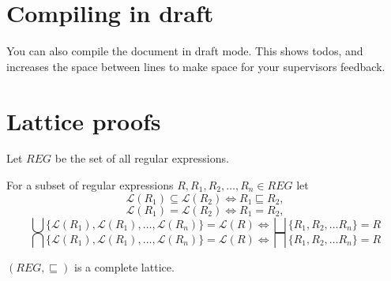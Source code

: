 
\section{Compiling in draft}\label{sec:compiling-in-draft}
You can also compile the document in draft mode.
This shows todos, and increases the space between lines to make space for your supervisors feedback.

\section{Lattice proofs}

Let $REG$ be the set of all regular expressions.

For a subset of regular expressions $R, R_1, R_2, \dots, R_n \in REG$ let 
\begin{equation*}
    \mathcal{L}(R_1) \subseteq \mathcal{L}(R_2) \iff R_1 \sqsubseteq R_2,
\end{equation*}
\begin{equation*}
    \mathcal{L}(R_1) = \mathcal{L}(R_2) \iff R_1 = R_2,
\end{equation*}
\begin{equation*}
    \bigcup \{\mathcal{L}(R_1), \mathcal{L}(R_1), \dots, \mathcal{L}(R_n)\} = \mathcal{L}(R) \iff \bigsqcup \{ R_1, R_2, \dots R_n \} = R
\end{equation*}
\begin{equation*}
    \bigcap \{\mathcal{L}(R_1), \mathcal{L}(R_1), \dots, \mathcal{L}(R_n)\} = \mathcal{L}(R) \iff \bigsqcap \{ R_1, R_2, \dots R_n \} = R
\end{equation*}

\begin{theorem}
    $(REG, \sqsubseteq)$ is a complete lattice.
\end{theorem}

